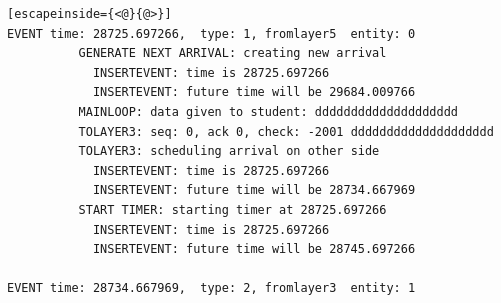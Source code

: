 \documentclass[paper=a4, fontsize=11pt]{scrartcl}
\numberwithin{equation}{section}		%
\numberwithin{figure}{section}			%
\numberwithin{table}{section}				%
\begin{document}
\begin{lstlisting}[escapeinside={<@}{@>}]
EVENT time: 28725.697266,  type: 1, fromlayer5  entity: 0
          GENERATE NEXT ARRIVAL: creating new arrival
            INSERTEVENT: time is 28725.697266
            INSERTEVENT: future time will be 29684.009766
          MAINLOOP: data given to student: dddddddddddddddddddd
          TOLAYER3: seq: 0, ack 0, check: -2001 dddddddddddddddddddd
          TOLAYER3: scheduling arrival on other side
            INSERTEVENT: time is 28725.697266
            INSERTEVENT: future time will be 28734.667969
          START TIMER: starting timer at 28725.697266
            INSERTEVENT: time is 28725.697266
            INSERTEVENT: future time will be 28745.697266

EVENT time: 28734.667969,  type: 2, fromlayer3  entity: 1

\end{lstlisting}

\end{document}
